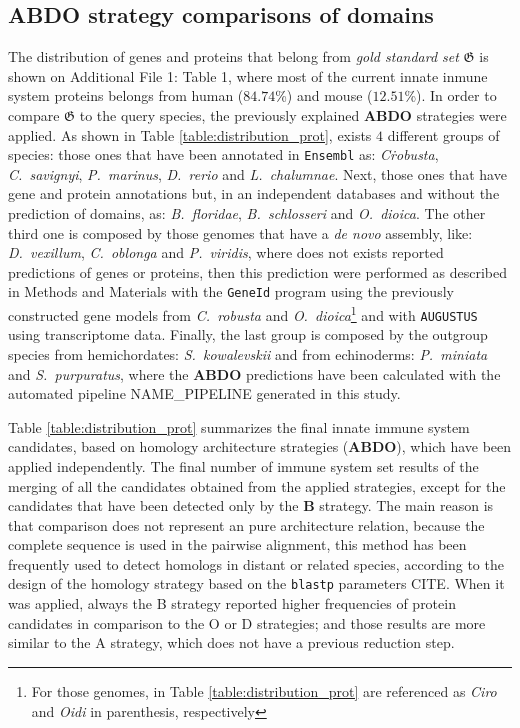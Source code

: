 \documentclass[11pt]{article}
\newcommand{\TODO}[1]{\begingroup\color{red}#1\endgroup}
\begin{document}
\subsection*{\textbf{ABDO} strategy comparisons of domains} \label{subODB}

The distribution of genes and proteins that belong from \textsl{gold standard set} 
$\boldsymbol{\mathfrak{G}}$ is shown on Additional File 1: Table 1, where most of
the current innate inmune system proteins belongs from human ($84.74$\%) and mouse ($12.51$\%).
In order to compare $\boldsymbol{\mathfrak{G}}$ to the query species, the previously explained 
\textbf{ABDO} strategies were applied. As shown in Table \ref{table:distribution_prot}, exists 
$4$ different groups of species: those ones that have been annotated in \texttt{Ensembl} as: 
\textit{C\. robusta}, \textit{C.\ savignyi}, \textit{P.\ marinus}, \textit{D.\ rerio} 
and \textit{L.\ chalumnae}. Next, those ones that have gene and protein annotations but,
in an independent databases and without the prediction of domains, as: \textit{B.\ floridae},
\textit{B.\ schlosseri} and \textit{O.\ dioica}. The other third one is composed by those 
genomes that have a \textsl{de novo} assembly, like: \textit{D.\ vexillum}, 
\textit{C.\ oblonga} and \textit{P.\ viridis}, where does not exists reported predictions 
of genes or proteins, then this prediction were performed as described in Methods and 
Materials with the \texttt{GeneId} program using the previously constructed 
gene models from \textit{C.\ robusta} and \textit{O.\ dioica}\footnote{For 
those genomes, in Table \ref{table:distribution_prot} are referenced as 
\textsl{Ciro} and \textsl{Oidi} in parenthesis, respectively} and with 
\texttt{AUGUSTUS} using transcriptome data. Finally, the last group is composed 
by the outgroup species from hemichordates: \textit{S.\ kowalevskii} and
from echinoderms: \textit{P.\ miniata} and \textit{S.\ purpuratus}, where the \textbf{ABDO} 
predictions have been calculated with the automated pipeline \TODO{NAME\_PIPELINE} generated
in this study.

Table \ref{table:distribution_prot} summarizes the final innate immune system 
candidates, based on homology architecture strategies (\textbf{ABDO}), which 
have been applied independently. The final number of immune system set results 
of the merging of all the candidates obtained from the applied strategies, 
except for the candidates that have been detected only by the \textbf{B} 
strategy. The main reason is that comparison does not represent an 
pure architecture relation, because the complete sequence is used in the 
pairwise alignment, this method has been frequently used to detect homologs 
in distant or related species, according to the design of the homology strategy 
based on the \texttt{blastp} parameters \TODO{CITE}. When it was applied, 
always the B strategy reported higher frequencies of protein candidates in 
comparison to the O or D strategies; and those results are more similar to the 
A strategy, which does not have a previous reduction step. 
\end{document}
